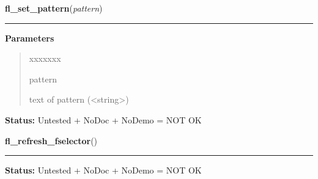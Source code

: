 \hspace{.8\funcindent}\begin{boxedminipage}{\funcwidth}

    \raggedright \textbf{fl\_set\_pattern}(\textit{pattern})

    \vspace{-1.5ex}

    \rule{\textwidth}{0.5\fboxrule}
\setlength{\parskip}{2ex}
\setlength{\parskip}{1ex}
      \textbf{Parameters}
      \vspace{-1ex}

      \begin{quote}
        \begin{Ventry}{xxxxxxx}

          \item[pattern]

          text of pattern ({\textless}string{\textgreater})

        \end{Ventry}

      \end{quote}

\textbf{Status:} Untested + NoDoc + NoDemo = NOT OK



    \end{boxedminipage}

    \label{xformslib:library:fl_refresh_fselector}

    \vspace{0.5ex}

\hspace{.8\funcindent}\begin{boxedminipage}{\funcwidth}

    \raggedright \textbf{fl\_refresh\_fselector}()

    \vspace{-1.5ex}

    \rule{\textwidth}{0.5\fboxrule}
\setlength{\parskip}{2ex}
\setlength{\parskip}{1ex}
\textbf{Status:} Untested + NoDoc + NoDemo = NOT OK



    \end{boxedminipage}

    \label{xformslib:library:fl_add_fselector_appbutton}

